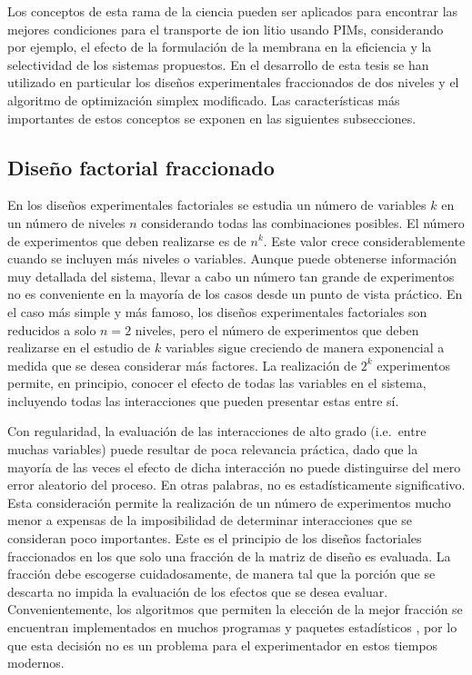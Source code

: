 Los conceptos de esta rama de la ciencia pueden ser aplicados para encontrar las mejores condiciones para el transporte de ion litio usando PIMs, considerando por ejemplo, el efecto de la formulación de la membrana en la eficiencia y la selectividad de los sistemas propuestos. En el desarro\-llo de esta tesis se han utilizado en particular los diseños experimentales fraccionados de dos niveles y el algoritmo de optimización simplex modificado. Las características más importantes de estos conceptos se exponen en las siguientes subsecciones.

\subsection{Diseño factorial fraccionado}\label{sec:FrF2introd}
En los diseños experimentales factoriales se estudia un número de variables $k$ en un número de niveles $n$ considerando todas las combinaciones posibles. El número de experimentos que deben realizarse es de $n^k$. Este valor crece considerablemente cuando se incluyen más niveles o variables. Aunque puede obtenerse información muy detallada del sistema, llevar a cabo un número tan grande de experimentos no es conveniente en la mayoría de los casos desde un punto de vista práctico. En el caso más simple y más famoso, los diseños experimentales factoriales son reducidos a solo $n=2$ niveles, pero el número de experimentos que deben realizarse en el estudio de $k$ variables sigue creciendo de manera exponencial a medida que se desea considerar más factores. La realización de $2^k$ experimentos permite, en principio, conocer el efecto de todas las variables en el sistema, incluyendo todas las interacciones que pueden presentar estas entre sí.

Con regularidad, la evaluación de las interacciones de alto grado (i.e.\ entre muchas variables) puede resultar de poca relevancia práctica, dado que la mayoría de las veces el efecto de dicha interacción no puede distinguirse del mero error aleatorio del proceso. En otras palabras, no es estadísticamente significativo. Esta consideración permite la realización de un número de experimentos mucho menor a expensas de la imposibilidad de determinar interacciones que se consideran poco importantes. Este es el principio de los diseños factoriales fraccionados en los que solo una fracción de la matriz de diseño es evaluada. La fracción debe escogerse cuidadosamente, de manera tal que la porción que se descarta no impida la evaluación de los efectos que se desea evaluar. Convenientemente, los algoritmos que permiten la elección de la {mejor fracción} se encuentran implementados en muchos programas y paquetes estadísticos \citep{FrF2}, por lo que esta decisión no es un problema para el experimentador en estos tiempos modernos.

